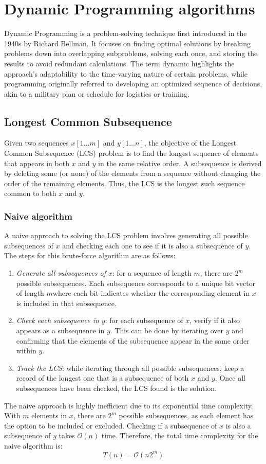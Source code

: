 \section{Dynamic Programming algorithms}

Dynamic Programming is a problem-solving technique first introduced in the 1940s by Richard Bellman.
It focuses on finding optimal solutions by breaking problems down into overlapping subproblems, solving each once, and storing the results to avoid redundant calculations. 
The term dynamic highlights the approach's adaptability to the time-varying nature of certain problems, while programming originally referred to developing an optimized sequence of decisions, akin to a military plan or schedule for logistics or training.

\subsection{Longest Common Subsequence}
Given two sequences $x[1\dots m]$ and $y[1\dots n]$, the objective of the Longest Common Subsequence (LCS) problem is to find the longest sequence of elements that appears in both $x$ and $y$ in the same relative order.
A subsequence is derived by deleting some (or none) of the elements from a sequence without changing the order of the remaining elements. 
Thus, the LCS is the longest such sequence common to both $x$ and $y$.

\subsubsection{Naive algorithm}
A naive approach to solving the LCS problem involves generating all possible subsequences of $x$ and checking each one to see if it is also a subsequence of $y$. 
The steps for this brute-force algorithm are as follows:
\begin{enumerate}
    \item \textit{Generate all subsequences of $x$}: for a sequence of length $m$, there are $2^m$ possible subsequences. 
        Each subsequence corresponds to a unique bit vector of length $m$where each bit indicates whether the corresponding element in $x$ is included in that subsequence.
    \item \textit{Check each subsequence in $y$}: for each subsequence of $x$, verify if it also appears as a subsequence in $y$. 
        This can be done by iterating over $y$ and confirming that the elements of the subsequence appear in the same order within $y$.
    \item \textit{Track the LCS}: while iterating through all possible subsequences, keep a record of the longest one that is a subsequence of both $x$ and $y$. 
        Once all subsequences have been checked, the LCS found is the solution.
\end{enumerate}
The naive approach is highly inefficient due to its exponential time complexity.
With $m$ elements in $x$, there are $2^m$ possible subsequences, as each element has the option to be included or excluded.
Checking if a subsequence of $x$ is also a subsequence of $y$ takes $\mathcal{O}(n)$ time.
Therefore, the total time complexity for the naive algorithm is:
\[T(n)=\mathcal{O}(n2^m)\]

